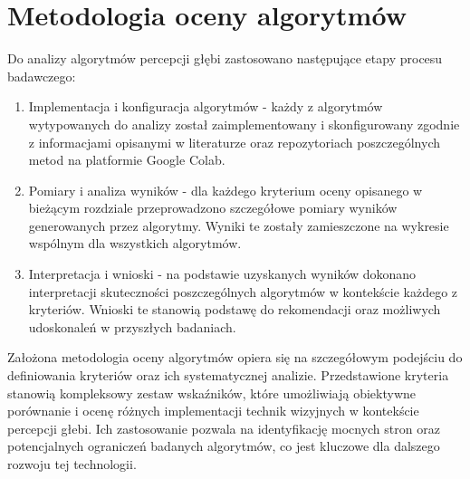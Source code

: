 \section{Metodologia oceny algorytmów}
Do analizy algorytmów percepcji głębi zastosowano następujące etapy procesu badawczego:
\begin{enumerate}
    \item Implementacja i konfiguracja algorytmów - każdy z algorytmów wytypowanych do analizy został zaimplementowany i skonfigurowany zgodnie z informacjami opisanymi w literaturze oraz repozytoriach poszczególnych metod na platformie Google Colab.
    \item Pomiary i analiza wyników - dla każdego kryterium oceny opisanego w bieżącym rozdziale przeprowadzono szczegółowe pomiary wyników generowanych przez algorytmy. Wyniki te zostały zamieszczone na wykresie wspólnym dla wszystkich algorytmów.
    \item Interpretacja i wnioski - na podstawie uzyskanych wyników dokonano interpretacji skuteczności poszczególnych algorytmów w kontekście każdego z kryteriów. Wnioski te stanowią podstawę do rekomendacji oraz możliwych udoskonaleń w przyszłych badaniach.
\end{enumerate}

Założona metodologia oceny algorytmów opiera się na szczegółowym podejściu do definiowania kryteriów oraz ich systematycznej analizie. Przedstawione kryteria stanowią kompleksowy zestaw wskaźników, które umożliwiają obiektywne porównanie i ocenę różnych implementacji technik wizyjnych w kontekście percepcji głebi. Ich zastosowanie pozwala na identyfikację mocnych stron oraz potencjalnych ograniczeń badanych algorytmów, co jest kluczowe dla dalszego rozwoju tej technologii.
